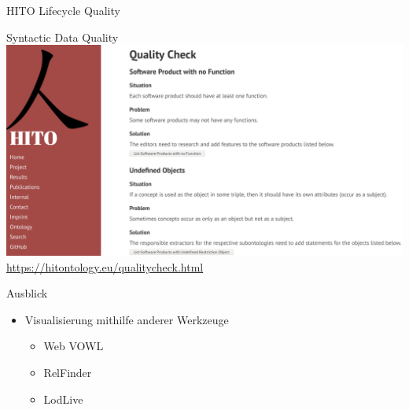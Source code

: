 \documentclass[aspectratio=1610,12pt]{beamer}
\begin{document}
\begin{frame}{HITO Lifecycle Quality}
  \centering
  \vspace{-0.5cm}
\end{frame}

\begin{frame}{Syntactic Data Quality}
  \vspace{-0.3cm}
  \centering
  \includegraphics[height=.75\textheight]{img/qualitychecker.png}
  \footnotesize{\url{https://hitontology.eu/qualitycheck.html}}
\end{frame}

\begin{frame}{Ausblick}
\begin{spacing}{1.5}
\begin{itemize}
  \item Visualisierung mithilfe anderer Werkzeuge
  \begin{itemize}
    \item Web VOWL
    \item RelFinder
    \item LodLive
  \end{itemize}
\end{itemize}
\end{spacing}
\end{frame}

\end{document}
